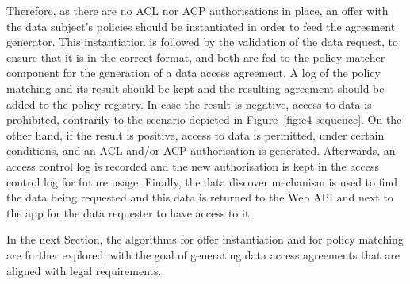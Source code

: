 Therefore, as there are no ACL nor ACP authorisations in place, an offer with the data subject's policies should be instantiated in order to feed the agreement generator.
This instantiation is followed by the validation of the data request, to ensure that it is in the correct format, and both are fed to the policy matcher component for the generation of a data access agreement.
A log of the policy matching and its result should be kept and the resulting agreement should be added to the policy registry.
In case the result is negative, access to data is prohibited, contrarily to the scenario depicted in Figure~\ref{fig:c4-sequence}.
On the other hand, if the result is positive, access to data is permitted, under certain conditions, and an ACL and/or ACP authorisation is generated.
Afterwards, an access control log is recorded and the new authorisation is kept in the access control log for future usage.
Finally, the data discover mechanism is used to find the data being requested and this data is returned to the Web API and next to the app for the data requester to have access to it.

In the next Section, the algorithms for offer instantiation and for policy matching are further explored, with the goal of generating data access agreements that are aligned with legal requirements.